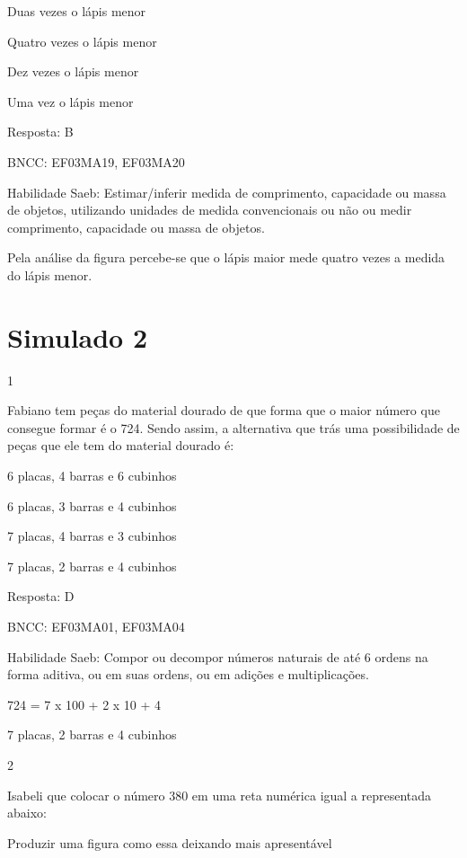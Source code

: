 \begin{escolha}
\begin{escolha}
\item
  Duas vezes o lápis menor
\item
  Quatro vezes o lápis menor
\item
  Dez vezes o lápis menor
\item
  Uma vez o lápis menor
\end{escolha}

Resposta: B

BNCC: EF03MA19, EF03MA20

Habilidade Saeb: Estimar/inferir medida de comprimento, capacidade ou
massa de objetos, utilizando unidades de medida convencionais ou não ou
medir comprimento, capacidade ou massa de objetos.

Pela análise da figura percebe-se que o lápis maior mede quatro vezes a
medida do lápis menor.

\chapter{Simulado 2}

\num{1}

Fabiano tem peças do material dourado de que forma que o maior número
que consegue formar é o 724. Sendo assim, a alternativa que trás uma
possibilidade de peças que ele tem do material dourado é:

\begin{escolha}
\item
  6 placas, 4 barras e 6 cubinhos
\item
  6 placas, 3 barras e 4 cubinhos
\item
  7 placas, 4 barras e 3 cubinhos
\item
  7 placas, 2 barras e 4 cubinhos
\end{escolha}

Resposta: D

BNCC: EF03MA01, EF03MA04

Habilidade Saeb: Compor ou decompor números naturais de até 6 ordens na
forma aditiva, ou em suas ordens, ou em adições e multiplicações.

724 = 7 x 100 + 2 x 10 + 4

7 placas, 2 barras e 4 cubinhos

\num{2}

Isabeli que colocar o número 380 em uma reta numérica igual a
representada abaixo:

Produzir uma figura como essa deixando mais apresentável


\end{escolha}
